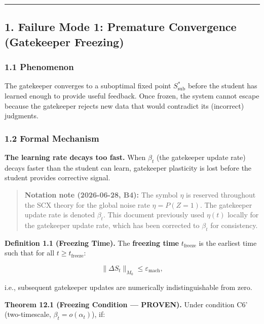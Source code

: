 \documentclass[
  12pt,
]{article}
\begin{document}
\begin{center}\rule{0.5\linewidth}{0.5pt}\end{center}

\subsection{1. Failure Mode 1: Premature Convergence (Gatekeeper
Freezing)}\label{failure-mode-1-premature-convergence-gatekeeper-freezing}

\subsubsection{1.1 Phenomenon}\label{phenomenon}

The gatekeeper converges to a suboptimal fixed point
\(S^*_{\text{sub}}\) before the student has learned enough to provide
useful feedback. Once frozen, the system cannot escape because the
gatekeeper rejects new data that would contradict its (incorrect)
judgments.

\subsubsection{1.2 Formal Mechanism}\label{formal-mechanism}

\textbf{The learning rate decays too fast.} When \(\beta_t\) (the
gatekeeper update rate) decays faster than the student can learn,
gatekeeper plasticity is lost before the student provides corrective
signal.

\begin{quote}
\textbf{Notation note (2026-06-28, B4):} The symbol \(\eta\) is reserved
throughout the SCX theory for the global noise rate \(\eta = P(Z=1)\).
The gatekeeper update rate is denoted \(\beta_t\). This document
previously used \(\eta(t)\) locally for the gatekeeper update rate,
which has been corrected to \(\beta_t\) for consistency.
\end{quote}

\textbf{Definition 1.1 (Freezing Time).} The \textbf{freezing time}
\(t_{\text{freeze}}\) is the earliest time such that for all
\(t \geq t_{\text{freeze}}\):

\[\|\Delta S_t\|_{M_0} \leq \varepsilon_{\text{mach}},\]

i.e., subsequent gatekeeper updates are numerically indistinguishable
from zero.

\textbf{Theorem 12.1 (Freezing Condition --- PROVEN).} Under condition
C6' (two-timescale, \(\beta_t = o(\alpha_t)\)), if:
\end{document}
